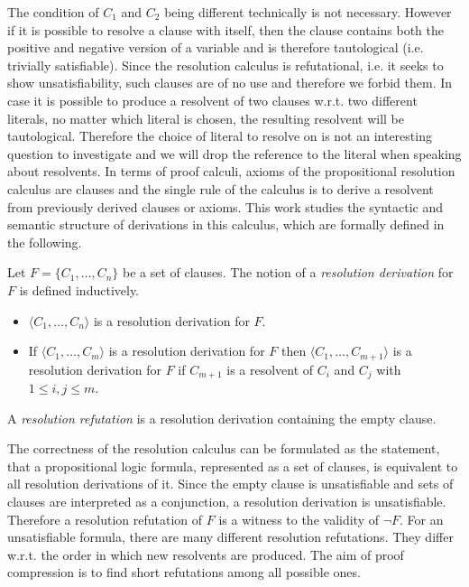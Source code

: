 The condition of $C_1$ and $C_2$ being different technically is not necessary.
However if it is possible to resolve a clause with itself, then the clause contains both the positive and negative version of a variable and is therefore tautological (i.e. trivially satisfiable).
Since the resolution calculus is refutational, i.e. it seeks to show unsatisfiability, such clauses are of no use and therefore we forbid them.
In case it is possible to produce a resolvent of two clauses w.r.t. two different literals, no matter which literal is chosen, the resulting resolvent will be tautological.
Therefore the choice of literal to resolve on is not an interesting question to investigate and we will drop the reference to the literal when speaking about resolvents.
In terms of proof calculi, axioms of the propositional resolution calculus are clauses and the single rule of the calculus is to derive a resolvent from previously derived clauses or axioms.
This work studies the syntactic and semantic structure of derivations in this calculus, which are formally defined in the following.

\begin{definition}

Let $F = \{C_1, \ldots, C_n\}$ be a set of clauses.
The notion of a \emph{resolution derivation} for $F$ is defined inductively.
\begin{itemize}
	\item $\langle C_1, \ldots, C_n\rangle$ is a resolution derivation for $F$.
	\item If $\langle C_1, \ldots, C_m\rangle$ is a resolution derivation for $F$ then $\langle C_1, \ldots, C_{m+1} \rangle$ is a resolution derivation for $F$ if $C_{m+1}$ is a resolvent of $C_i$ and $C_j$ with $1 \leq i,j \leq m$.
\end{itemize}
A \emph{resolution refutation} is a resolution derivation containing the empty clause.

\end{definition}

The correctness of the resolution calculus can be formulated as the statement, that a propositional logic formula, represented as a set of clauses, is equivalent to all resolution derivations of it. 
Since the empty clause is unsatisfiable and sets of clauses are interpreted as a conjunction, a resolution derivation is unsatisfiable.
Therefore a resolution refutation of $F$ is a witness to the validity of $\neg F$.
For an unsatisfiable formula, there are many different resolution refutations.
They differ w.r.t. the order in which new resolvents are produced.
The aim of proof compression is to find short refutations among all possible ones.

